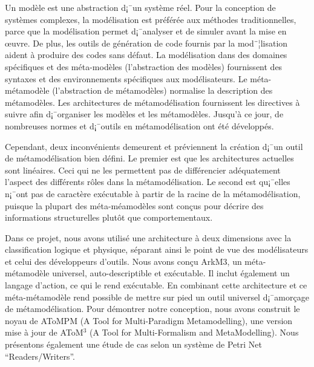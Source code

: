 
Un mod\`ele est une abstraction d¡¯un syst\`eme r\'eel. Pour la conception de syst\`emes complexes, la mod\'elisation est pr\'ef\'er\'ee aux m\'ethodes traditionnelles, parce que la mod\'elisation permet d¡¯analyser et de simuler avant la mise en {\oe}uvre. De plus, les outils de g\'en\'eration de code fournis par la mod¨¦lisation aident \`a produire des codes sans d\'efaut. La mod\'elisation dans des domaines sp\'ecifiques et des m\'eta-mod\`eles (l'abstraction des mod\`eles) fournissent des syntaxes et des environnements sp\'ecifiques aux mod\'elisateurs. Le m\'eta-m\'etamod\`ele (l'abstraction de m\'etamod\`eles) normalise la description des m\'etamod\`eles. Les architectures de m\'etamod\'elisation fournissent les directives \`a suivre afin d¡¯organiser les mod\`eles et les m\'etamod\`eles. Jusqu'\`a ce jour, de nombreuses normes et d¡¯outils en m\'etamod\'elisation  ont \'et\'e d\'evelopp\'es.



Cependant, deux inconv\'enients demeurent et pr\'eviennent la cr\'eation d¡¯un outil de m\'etamod\'elisation bien d\'efini. Le premier est que les architectures actuelles sont lin\'eaires. Ceci qui ne les permettent pas de diff\'erencier ad\'equatement l'aspect des diff\'erents r\^oles dans la m\'etamod\'elisation. Le second est qu¡¯elles n¡¯ont pas de caract\`ere ex\'ecutable \`a partir de la racine de la m\'etamod\'elisation, puisque la plupart des m\'eta-m\'eamod\`eles sont con{\c c}us pour d\'ecrire des informations structurelles plut\^ot que comportementaux.


Dans ce projet, nous avons utilis\'e une architecture \`a deux dimensions avec la classification logique et physique, s\'eparant ainsi le point de vue des mod\'elisateurs et celui des d\'eveloppeurs d'outils. Nous avons con{\c c}u ArkM3, un m\'eta-m\'etamod\`ele universel, auto-descriptible et ex\'ecutable. Il inclut \'egalement un langage d'action, ce qui le rend ex\'ecutable. En combinant cette architecture et ce m\'eta-m\'etamod\`ele rend possible de mettre sur pied un outil universel d¡¯amor{\c c}age de m\'etamod\'elisation. Pour d\'emontrer notre conception, nous avons construit le noyau de AToMPM (A Tool for Multi-Paradigm Metamodelling), une version mise \`a jour de AToM$^3$ (A Tool for Multi-Formalism and MetaModelling). Nous pr\'esentons \'egalement une \'etude de cas selon un syst\`eme de Petri Net ``Readers/Writers''.




